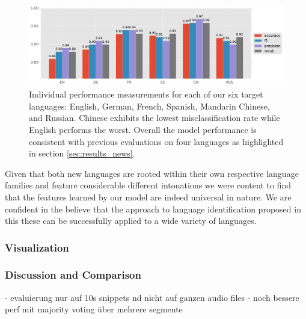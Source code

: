 	\begin{figure}[]
  		\centering
    	\includegraphics[width=\textwidth, keepaspectratio]{plots/results_6lang_plot.pdf}
    	\caption{Individual performance measurements for each of our six target languages: English, German, French, Spanish, Mandarin Chinese, and Russian. Chinese exhibits the lowest misclassification rate while English performs the worst. Overall the model performance is consistent with previous evaluations on four languages as highlighted in section \ref{sec:results_news}.}
    	\label{fig:6lang}
	\end{figure}

Given that both new languages are rooted within their own respective language families and feature considerable different intonations we were content to find that the features learned by our model are indeed universal in nature. We are confident in the believe that the approach to language identification proposed in this these can be successfully applied to a wide variety of languages.

\subsubsection{Visualization} 
\label{sec:visualization}

\subsubsection{Discussion and Comparison} 
\label{sec:comparison}

- evaluierung nur auf 10s snippets nd nicht auf ganzen audio files
- noch bessere perf mit majority voting über mehrere segmente
